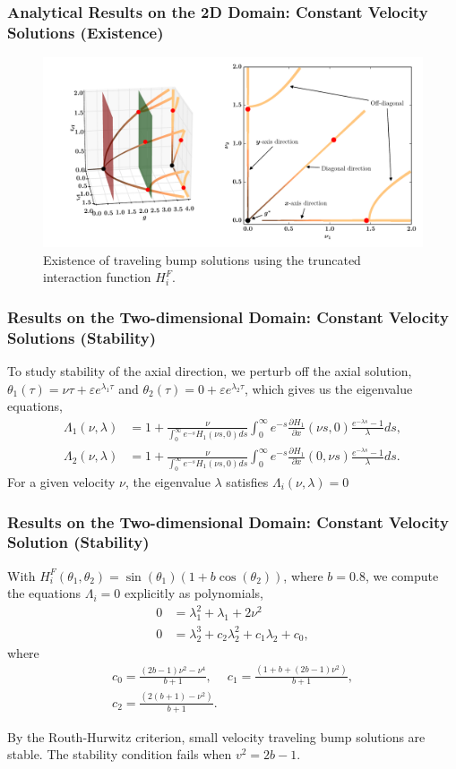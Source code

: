\documentclass{beamer}
\newcommand{\ve}{\varepsilon}
\newcommand{\pa}{\partial}
\begin{document}
\begin{frame}
\frametitle{Analytical Results on the 2D Domain: Constant Velocity Solutions (Existence)}
\begin{figure}
 \centering
 \includegraphics[width=.7\textwidth]{twod_wave_exist_trunc_v4.pdf}
 \caption{Existence of traveling bump solutions using the truncated interaction function $H_i^F$.}

 \end{figure}
\end{frame}


\begin{frame}
\frametitle{Results on the Two-dimensional Domain: Constant Velocity Solutions (Stability)}
To study stability of the axial direction, we perturb off the axial solution, $\theta_1(\tau) = \nu\tau + \ve e^{\lambda_1 \tau}$ and $\theta_2(\tau) = 0 + \ve e^{\lambda_2 \tau}$, which gives us the eigenvalue equations,
\begin{align*}\label{eq:Lambdai}
 \Lambda_1(\nu,\lambda) &= 1 + \frac{\nu}{\int_0^\infty e^{-s} H_1(\nu s, 0) ds} \int_0^\infty e^{-s} \frac{\pa H_1}{\pa x}(\nu s, 0)\frac{e^{-\lambda s}-1}{\lambda}ds,\\
 \Lambda_2(\nu,\lambda) &= 1 + \frac{\nu}{\int_0^\infty e^{-s} H_1(\nu s, 0) ds} \int_0^\infty e^{-s} \frac{\pa H_1}{\pa x}(0, \nu s)\frac{e^{-\lambda s}-1}{\lambda}ds.
\end{align*}
For a given velocity $\nu$, the eigenvalue $\lambda$ satisfies $\Lambda_i(\nu,\lambda)=0$ 
\end{frame}


\begin{frame}
\frametitle{Results on the Two-dimensional Domain: Constant Velocity Solution (Stability)}
With $H_i^F(\theta_1,\theta_2) = \sin(\theta_1)(1+b\cos(\theta_2))$, where $b=0.8$, we compute the equations $\Lambda_i=0$ explicitly as polynomials,
\begin{align*}
 0 &= \lambda _1^2+\lambda _1+2 \nu ^2\\
 0 &= \lambda _2^3+c_2\lambda _2^2+c_1\lambda_2 + c_0,
\end{align*}
where
\begin{equation*}
 \begin{array}{ll}
 c_0 = \frac{(2b-1)\nu^2 - \nu^4}{b+1}, & c_1 = \frac{\left(1+b + (2b-1)\nu^2\right)}{b+1},\\
 c_2 = \frac{\left(2 (b+1)-\nu ^2\right)}{b+1}. & 
 \end{array}
\end{equation*}
 
By the Routh-Hurwitz criterion, small velocity traveling bump solutions are stable. The stability condition fails when $v^2 = 2b-1$.
\end{frame}
\end{document}
